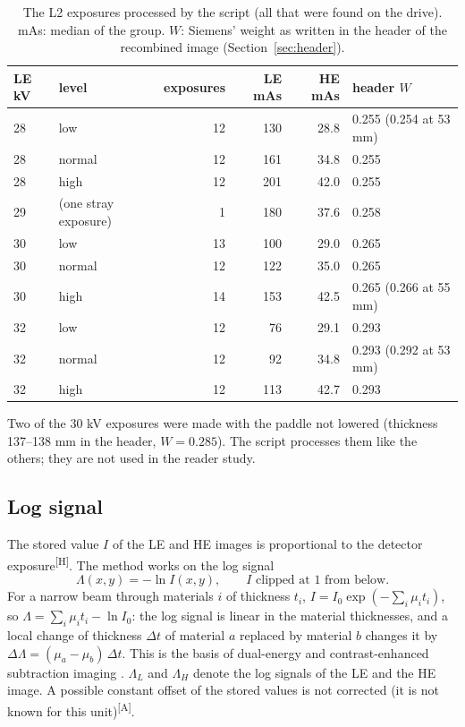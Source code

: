 \documentclass[11pt,a4paper]{article}
\newcommand{\LL}{\Lambda_L}
\newcommand{\LH}{\Lambda_H}
\newcommand{\Hd}{\textsuperscript{[H]}}
\newcommand{\As}{\textsuperscript{[A]}}
\begin{document}
\begin{table}[H]\centering\small
\caption{The L2 exposures processed by the script (all that were found on the drive). mAs: median of the group.
$W$: Siemens' weight as written in the header of the recombined image (Section~\ref{sec:header}).}\label{tab:data}
\begin{tabular}{llrrrl}
\toprule
LE kV & level & exposures & LE mAs & HE mAs & header $W$ \\
\midrule
28 & low    & 12 & 130 & 28.8 & 0.255 (0.254 at 53 mm) \\
28 & normal & 12 & 161 & 34.8 & 0.255 \\
28 & high   & 12 & 201 & 42.0 & 0.255 \\
29 & (one stray exposure) & 1 & 180 & 37.6 & 0.258 \\
30 & low    & 13 & 100 & 29.0 & 0.265 \\
30 & normal & 12 & 122 & 35.0 & 0.265 \\
30 & high   & 14 & 153 & 42.5 & 0.265 (0.266 at 55 mm) \\
32 & low    & 12 & 76  & 29.1 & 0.293 \\
32 & normal & 12 & 92  & 34.8 & 0.293 (0.292 at 53 mm) \\
32 & high   & 12 & 113 & 42.7 & 0.293 \\
\bottomrule
\end{tabular}
\end{table}
\noindent Two of the 30 kV exposures were made with the paddle not lowered (thickness 137--138 mm in the header,
$W=0.285$). The script processes them like the others; they are not used in the reader study.

\subsection{Log signal}
The stored value $I$ of the LE and HE images is proportional to the detector exposure\Hd. The method works on the
log signal
\begin{equation}
\Lambda(x,y) = -\ln I(x,y), \qquad I \text{ clipped at } 1 \text{ from below.}
\label{eq:log}
\end{equation}
For a narrow beam through materials $i$ of thickness $t_i$, $I = I_0\exp(-\sum_i \mu_i t_i)$, so
$\Lambda = \sum_i \mu_i t_i - \ln I_0$: the log signal is linear in the material thicknesses, and a local change of
thickness $\Delta t$ of material $a$ replaced by material $b$ changes it by $\Delta\Lambda=(\mu_a-\mu_b)\,\Delta t$.
This is the basis of dual-energy and contrast-enhanced subtraction imaging \cite{lehmann1981,lewin2003,korporaal2018}.
$\LL$ and $\LH$ denote the log signals of the LE and the HE image. A possible constant offset of the stored
values is not corrected (it is not known for this unit)\As.
\end{document}
